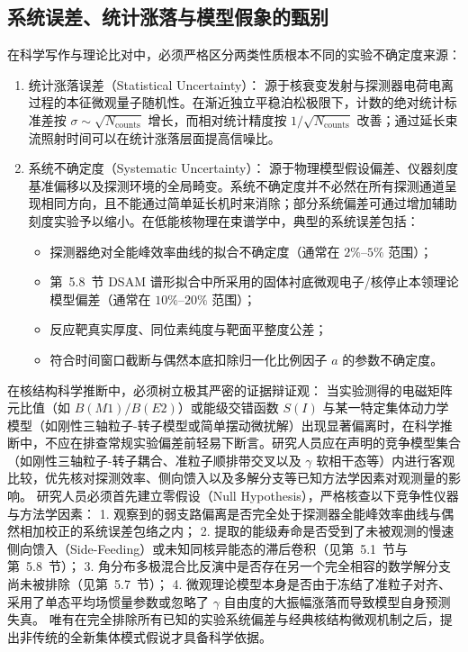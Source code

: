 \subsection{系统误差、统计涨落与模型假象的甄别}\label{subsec:5-10-4}

在科学写作与理论比对中，必须严格区分两类性质根本不同的实验不确定度来源：
\begin{enumerate}
\item 统计涨落误差（Statistical Uncertainty）：
源于核衰变发射与探测器电荷电离过程的本征微观量子随机性。在渐近独立平稳泊松极限下，计数的绝对统计标准差按 $\sigma \sim \sqrt{N_{\mathrm{counts}}}$ 增长，而相对统计精度按 $1/\sqrt{N_{\mathrm{counts}}}$ 改善；通过延长束流照射时间可以在统计涨落层面提高信噪比。
\item 系统不确定度（Systematic Uncertainty）：
源于物理模型假设偏差、仪器刻度基准偏移以及探测环境的全局畸变。系统不确定度并不必然在所有探测通道呈现相同方向，且不能通过简单延长机时来消除；部分系统偏差可通过增加辅助刻度实验予以缩小。在低能核物理在束谱学中，典型的系统误差包括：
\begin{itemize}
\item 探测器绝对全能峰效率曲线的拟合不确定度（通常在 $2\%$–$5\%$ 范围）；
\item 第~5.8~节 DSAM 谱形拟合中所采用的固体衬底微观电子/核停止本领理论模型偏差（通常在 $10\%$–$20\%$ 范围）；
\item 反应靶真实厚度、同位素纯度与靶面平整度公差；
\item 符合时间窗口截断与偶然本底扣除归一化比例因子 $a$ 的参数不确定度。
\end{itemize}
\end{enumerate}

在核结构科学推断中，必须树立极其严密的证据辩证观：
当实验测得的电磁矩阵元比值（如 $B(M1)/B(E2)$）或能级交错函数 $S(I)$ 与某一特定集体动力学模型（如刚性三轴粒子-转子模型或简单摆动微扰解）出现显著偏离时，在科学推断中，不应在排查常规实验偏差前轻易下断言。研究人员应在声明的竞争模型集合（如刚性三轴粒子-转子耦合、准粒子顺排带交叉以及 $\gamma$ 软相干态等）内进行客观比较，优先核对探测效率、侧向馈入以及多解分支等已知方法学因素对观测量的影响。
研究人员必须首先建立零假设（Null Hypothesis），严格核查以下竞争性仪器与方法学因素：
1. 观察到的弱支路偏离是否完全处于探测器全能峰效率曲线与偶然相加校正的系统误差包络之内；
2. 提取的能级寿命是否受到了未被观测的慢速侧向馈入（Side-Feeding）或未知同核异能态的滞后卷积（见第~5.1~节与第~5.8~节）；
3. 角分布多极混合比反演中是否存在另一个完全相容的数学解分支尚未被排除（见第~5.7~节）；
4. 微观理论模型本身是否由于冻结了准粒子对齐、采用了单态平均场惯量参数或忽略了 $\gamma$ 自由度的大振幅涨落而导致模型自身预测失真。
唯有在完全排除所有已知的实验系统偏差与经典核结构微观机制之后，提出非传统的全新集体模式假说才具备科学依据。

